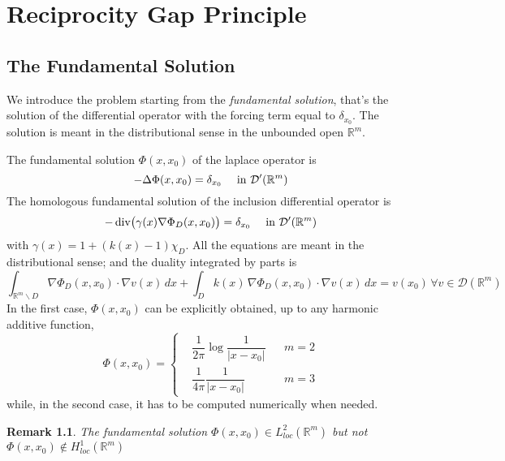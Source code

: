 \documentclass[10pt, a4paper, twoside, openright]{book}
\theoremstyle{definition}
\theoremstyle{plain}
\theoremstyle{plain}
\theoremstyle{plain}
\theoremstyle{plain}
\newtheorem{remark}[subsection]{Remark}
\theoremstyle{plain}
\theoremstyle{plain}
\theoremstyle{plain}
\theoremstyle{plain}
\DeclareMathOperator{\divergence}{div}
\begin{document}
\chapter{Reciprocity Gap Principle}
\label{ch:reciprocity}
\section{The Fundamental Solution}
\label{subsection:fundamental-solution}
We introduce the problem starting from the \emph{fundamental solution}, that's the solution of the differential operator with the forcing term equal to $\delta_{x_0}$.
The solution is meant in the distributional sense in the unbounded open $\mathbb{R}^m$. 
\par
The fundamental solution $\Phi(x,x_0)$ of the laplace operator is
\begin{equation}
 - \Delta \Phi(x,x_0) = \delta_{x_0} \quad \textup{ in }\mathcal{D}'(\mathbb{R}^m)\label{eq:fundamental-in-dist}
\end{equation}
The homologous fundamental solution of the inclusion differential operator is
\begin{equation}
 - \divergence\bigl(\gamma(x)\nabla \Phi_D(x,x_0)\bigr) = \delta_{x_0}\quad\textup{ in }\mathcal{D}'(\mathbb{R}^m)\label{eq:fundamental-D-in-dist}
\end{equation}
with $\gamma(x) = 1+(k(x)-1)\chi_D$. 
All the equations are meant in the distributional sense; and the duality integrated by parts is
\begin{equation}
 \int_{\mathbb{R}^m \backslash D}\nabla \Phi_D(x,x_0) \cdot \nabla v(x) \, dx + \int_{D} k(x) \, \nabla \Phi_D(x,x_0) \cdot \nabla v(x) \, dx = v(x_0) \, \forall v \in \mathcal{D}(\mathbb{R}^m)
\end{equation}
In the first case, $\Phi(x,x_0)$ can be explicitly obtained, up to any harmonic additive function,
\begin{equation}
\label{eq:definition-Phi-23}
  \Phi(x,x_0)=
  \left\{
  \begin{aligned}
   &\dfrac{1}{2\pi}\log\dfrac{1}{| x - x_0|} && m=2 \\
   &\dfrac{1}{4\pi}\dfrac{1}{| x  - x_0|} && m=3 
  \end{aligned}
  \right.
\end{equation}
while, in the second case, it has to be computed numerically when needed.
\par
\begin{remark}
 The fundamental solution $\Phi(x,x_0)\in L^2_{loc}(\mathbb{R}^m)$ but not $\Phi(x,x_0)\notin H^1_{loc}(\mathbb{R}^m)$
\end{remark}
\end{document}
